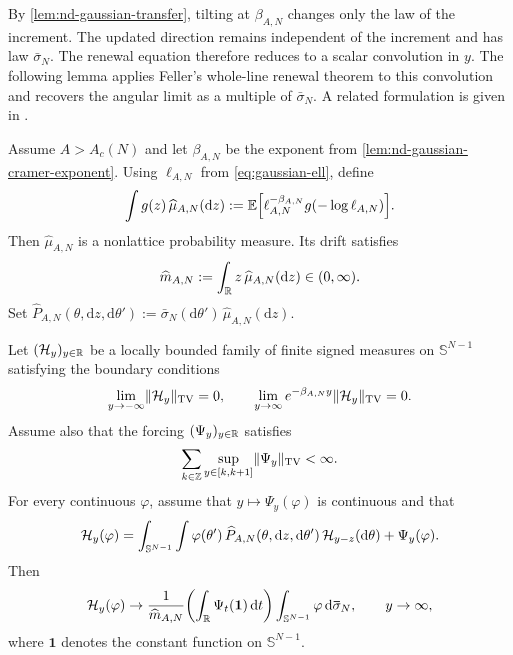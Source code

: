 \documentclass[11pt,reqno,a4paper]{article}
\newcommand{\Ee}{\E}
\begin{document}
By \cref{lem:nd-gaussian-transfer}, tilting at $\beta_{A,N}$ changes only the
law of the increment. The updated direction remains independent of the
increment and has law $\bar\sigma_N$. The renewal equation therefore reduces
to a scalar convolution in $y$. The following lemma applies Feller's whole-line
renewal theorem
\cite{feller1971vol2} to this convolution and recovers the angular limit as a
multiple of $\bar\sigma_N$. A related formulation is given in
\cite{gut2009stopped}.
\begin{lemma}\label{lem:nd-gaussian-renewal}
  Assume $A>A_c(N)$ and let $\beta_{A,N}$ be the exponent from
  \cref{lem:nd-gaussian-cramer-exponent}. Using $\ell_{A,N}$ from
  \cref{eq:gaussian-ell}, define
  \begin{equation}\label{eq:nd-tilted-increment-law}
    \int g(z)\,\widehat\mu_{A,N}(\mathrm{d}z)
    :=
    \Ee\left[
      \ell_{A,N}^{-\beta_{A,N}}
      g(-\log \ell_{A,N})
    \right].
  \end{equation}
  Then $\widehat\mu_{A,N}$ is a nonlattice probability measure. Its drift
  satisfies
  \begin{equation*}
    \widehat m_{A,N}
    :=
    \int_{\mathbb{R}} z\,\widehat\mu_{A,N}(\mathrm{d}z)
    \in(0,\infty).
  \end{equation*}
  Set
  $\widehat P_{A,N}(\theta,\mathrm{d}z,\mathrm{d}\theta')
  :=\bar\sigma_N(\mathrm{d}\theta')\,\widehat\mu_{A,N}(\mathrm{d}z)$.

  Let $(\mathcal H_y)_{y\in\mathbb{R}}$ be a locally bounded family of finite signed
  measures on $\mathbb S^{N-1}$ satisfying the boundary conditions
  \begin{equation}\label{eq:nd-renewal-boundary-conditions}
      \lim_{y\to-\infty}\lVert\mathcal H_y\rVert_{\mathrm{TV}}=0, \qquad
      \lim_{y\to\infty}
      e^{-\beta_{A,N}y}\lVert\mathcal H_y\rVert_{\mathrm{TV}}=0.
  \end{equation}
  Assume also that the forcing $(\Psi_y)_{y\in\mathbb{R}}$ satisfies
  \begin{equation}\label{eq:nd-dri-definition}
    \sum_{k\in\mathbb{Z}}
    \sup_{y\in[k,k+1]}\lVert\Psi_y\rVert_{\mathrm{TV}}
    <\infty .
  \end{equation}
  For every continuous $\varphi$, assume that
  $y\mapsto\Psi_y(\varphi)$ is continuous and that
  \begin{equation}\label{eq:nd-abstract-renewal-equation}
    \mathcal H_y(\varphi)
    =
    \int_{\mathbb S^{N-1}}
    \int
    \varphi(\theta')\,
    \widehat P_{A,N}(\theta,\mathrm{d}z,\mathrm{d}\theta')\,
    \mathcal H_{y-z}(\mathrm{d}\theta)
    +
    \Psi_y(\varphi).
  \end{equation}
  Then
  \begin{equation}\label{eq:nd-abstract-renewal-limit}
    \Hcal_y(\varphi)
    \to
    \frac{1}{\widehat m_{A,N}}
    \left(\int_\R \Psi_t(\mathbf 1)\,\mathrm{d}t\right)
    \int_{\mathbb S^{N-1}}\varphi\,\mathrm{d}\bar\sigma_N,
    \qquad
    y\to\infty,
  \end{equation}
  where $\mathbf 1$ denotes the constant function on $\mathbb S^{N-1}$.
\end{lemma}
\end{document}
